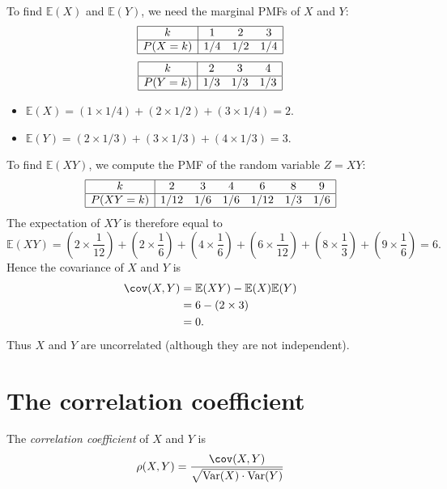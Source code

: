 \documentclass[lecture]{csm}
\newcommand{\expe}{\mathbb{E}}
\newcommand{\var}{\text{Var}}
\def\it{\item}
\def\bit{\begin{itemize}}
\def\eit{\end{itemize}}
\begin{document}
\begin{solution}
To find $\expe(X)$ and $\expe(Y)$, we need the marginal PMFs of $X$ and $Y$:
\[\begin{array}{|c|ccc|}\hline
k		& 1		& 2		& 3		\\ \hline
P(X=k)	& 1/4	& 1/2	& 1/4	\\ \hline
\end{array}\]
\[\begin{array}{|c|ccc|}\hline
k		& 2		& 3		& 4		\\ \hline
P(Y=k)	& 1/3	& 1/3	& 1/3	\\ \hline
\end{array}\]
\bit
\it $\expe(X) = \left(1\times 1/4\right) + \left(2\times 1/2\right) + \left(3\times 1/4\right) = 2$.
\it $\expe(Y) = \left(2\times 1/3\right) + \left(3\times 1/3\right) + \left(4\times 1/3\right) = 3$.
\eit

\newpage

To find $\expe(XY)$, we compute the PMF of the random variable $Z=XY$:
\[\begin{array}{|c|cccccc|}\hline
k		& 2		& 3		& 4		& 6		& 8		& 9	\\ \hline
P(XY=k)	& 1/12	& 1/6	& 1/6	& 1/12	& 1/3	& 1/6 \\ \hline
\end{array}\]
The expectation of $XY$ is therefore equal to
\[
\expe(XY) = \left(2\times\frac{1}{12}\right) + \left(2\times\frac{1}{6}\right) + \left(4\times\frac{1}{6}\right) + \left(6\times\frac{1}{12}\right) + \left(8\times\frac{1}{3}\right) + \left(9\times\frac{1}{6}\right) = 6.
\]
Hence the covariance of $X$ and $Y$ is
\begin{align*}
\cov(X,Y)
	& =\expe(XY)-\expe(X)\expe(Y) \\
	& = 6 - (2\times 3) \\
	& = 0.
\end{align*}
Thus $X$ and $Y$ are uncorrelated (although they are not independent).
\end{solution}

\section{The correlation coefficient}

\begin{definition}
The \emph{correlation coefficient} of $X$ and $Y$ is 
\[
\rho(X,Y) = \frac{\cov(X,Y)}{\sqrt{\var(X)\cdot\var(Y)}}
\]
\end{definition}
\end{document}

